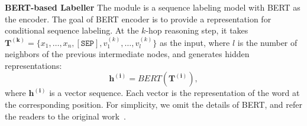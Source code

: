 \documentclass[letterpaper]{article} %
\begin{document}

\medskip\noindent\textbf{BERT-based Labeller}\hspace{1em}
The module is a sequence labeling model with BERT as the encoder. 
The goal of BERT encoder is to provide a representation for conditional sequence labeling. At the $k$-hop reasoning step, it takes $\bm{T^{(k)}}=\{x_1, \dots,x_{n},\mathtt{[SEP]},v^{(k)}_1,\dots,v^{(k)}_{l}\}$ as the input, where $l$ is the number of neighbors of the previous intermediate nodes, and generates hidden representations:
\begin{equation}
\bm{h^{(i)}}= BERT(\bm{T^{(i)}}),
\end{equation}
where $\bm{h^{(i)}}$ is a vector sequence. Each vector is the representation of the word at the corresponding position. 
For  simplicity, we omit the details of BERT, and refer the readers to the original work~\cite{devlin-et-al:bert}.
\end{document}

